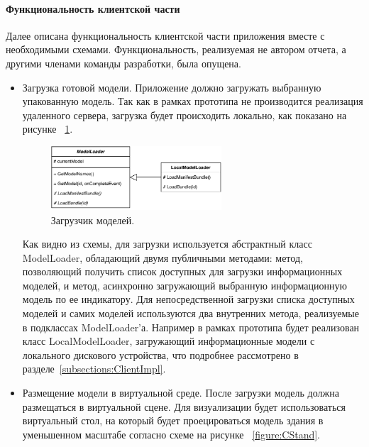 ﻿\paragraph{Функциональность клиентской части}

Далее описана функциональность клиентской части приложения
вместе с необходимыми схемами.
Функциональность, реализуемая не автором отчета,
а другими членами команды разработки, была опущена.

\begin{itemize}
    \item {
        Загрузка готовой модели.
        Приложение должно загружать выбранную упакованную модель.
        Так как в рамках прототипа не производится реализация удаленного сервера,
        загрузка будет происходить локально, как показано на рисунке~%
        \ref{figure:CModelLoader}.

        \begin{figure}[ht]
            \centering
            \includegraphics[width=0.6\textwidth]{images/UML-CModelLoader.pdf}
            \caption{Загрузчик моделей.}
            \label{figure:CModelLoader}
        \end{figure}

        Как видно из схемы, для загрузки используется абстрактный класс ModelLoader,
        обладающий двумя публичными методами: метод, позволяющий получить список
        доступных для загрузки информационных моделей, и метод,
        асинхронно загружающий выбранную информационную модель по ее индикатору.
        Для непосредственной загрузки списка доступных моделей и самих моделей
        используются два внутренних метода, реализуемые в подклассах ModelLoader'а.
        Например в рамках прототипа будет реализован класс LocalModelLoader,
        загружающий информационные модели с локального дискового устройства,
        что подробнее рассмотрено в разделе~\ref{subsections:ClientImpl}.
    } 
    \item {
        Размещение модели в виртуальной среде.
        После загрузки модель должна размещаться в виртуальной сцене.
        Для визуализации будет использоваться виртуальный стол,
        на который будет проецироваться модель здания
        в уменьшенном масштабе согласно схеме на рисунке~%
        \ref{figure:CStand}.

}
\end{itemize}

